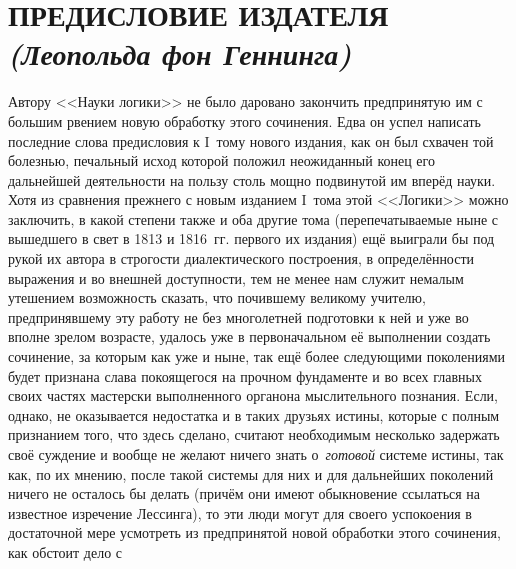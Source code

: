 \hrulefill

\chapter[\mdseries Предисловие издателя (Леопольда фон Геннинга)]%
{ПРЕДИСЛОВИЕ ИЗДАТЕЛЯ\\{\em (Леопольда фон Геннинга)}}

Автору <<Науки логики>> не было даровано закончить предпринятую им с большим
рвением новую обработку этого сочинения. Едва он успел написать последние
слова предисловия к I~тому нового издания, как он был схвачен той болезнью,
печальный исход которой положил неожиданный конец его дальнейшей
деятельности на пользу столь мощно подвинутой им вперёд науки. Хотя из
сравнения прежнего с новым изданием I~тома этой <<Логики>> можно заключить, в
какой степени также и оба другие тома (перепечатываемые ныне с вышедшего в
свет в 1813 и 1816~гг. первого их издания) ещё выиграли бы под рукой их
автора в строгости диалектического построения, в определённости выражения и
во внешней доступности, тем не менее нам служит немалым утешением
возможность сказать, что почившему великому учителю, предпринявшему эту
работу не без многолетней подготовки к ней и уже во вполне зрелом возрасте,
удалось уже в первоначальном её выполнении создать сочинение, за которым
как уже и ныне, так ещё более следующими поколениями будет признана слава
покоящегося на прочном фундаменте и во всех главных своих частях мастерски
выполненного органона мыслительного познания. Если, однако, не оказывается
недостатка и в таких друзьях истины, которые с полным признанием того, что
здесь сделано, считают необходимым несколько задержать своё суждение и
вообще не желают ничего знать о~{\em готовой} системе
истины, так как, по их мнению, после такой системы для них и для дальнейших
поколений ничего не осталось бы делать (причём они имеют обыкновение
ссылаться на известное изречение Лессинга), то эти люди могут для своего успокоения в достаточной мере
усмотреть из предпринятой новой обработки этого сочинения, как обстоит дело с
